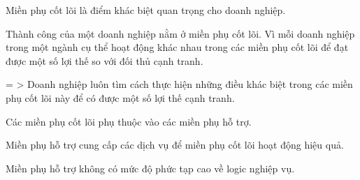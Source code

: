 \documentclass{article} %
\begin{document}

Miền phụ cốt lõi là điểm khác biệt quan trọng cho doanh nghiệp.

Thành công của một doanh nghiệp nằm ở miền phụ cốt lõi. Vì mỗi doanh nghiệp trong một ngành cụ thể hoạt động khác nhau trong các miền phụ cốt lõi để đạt được một số lợi thế so với đối thủ cạnh tranh.

= > Doanh nghiệp luôn tìm cách thực hiện những điều khác biệt trong các miền phụ cốt lõi này để có được một số lợi thế cạnh tranh.



Các miền phụ cốt lõi phụ thuộc vào các miền phụ hỗ trợ.

Miền phụ hỗ trợ cung cấp các dịch vụ để miền phụ cốt lõi hoạt động hiệu quả.

Miền phụ hỗ trợ không có mức độ phức tạp cao về logic nghiệp vụ.




% 


% 

\end{document}
